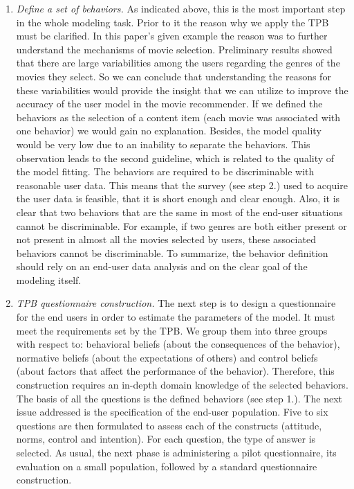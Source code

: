 \documentclass{llncs}
\begin{document}
\begin{enumerate}
 \item {\it Define a set of behaviors.} As indicated above, this is the most important step in the whole modeling task. Prior to it the reason why we apply the TPB must be clarified. In this paper’s given example the reason was to further understand the mechanisms of movie selection. Preliminary results showed that there are large variabilities among the users regarding the genres of the movies they select. So we can conclude that understanding the reasons for these variabilities would provide the insight that we can utilize to improve the accuracy of the user model in the movie recommender. If we defined the behaviors as the selection of a content item (each movie was associated with one behavior) we would gain no explanation. Besides, the model quality would be very low due to an inability to separate the behaviors. This observation leads to the second guideline, which is related to the quality of the model fitting. The behaviors are required to be discriminable with reasonable user data. This means that the survey (see step 2.) used to acquire the user data is feasible, that it is short enough and clear enough. Also, it is clear that two behaviors that are the same in most of the end-user situations cannot be discriminable. For example, if two genres are both either present or not present in almost all the movies selected by users, these associated behaviors cannot be discriminable. To summarize, the behavior definition should rely on an end-user data analysis and on the clear goal of the modeling itself.   
 \item {\it TPB questionnaire construction.} The next step is to design a questionnaire for the end users in order to estimate the parameters of the model. It must meet the requirements set by the TPB. We group them into three groups with respect to: behavioral beliefs (about the consequences of the behavior), normative beliefs (about the expectations of others) and control beliefs (about factors that affect the performance of the behavior). Therefore, this construction requires an in-depth domain knowledge of the selected behaviors. The basis of all the questions is the defined behaviors (see step 1.). The next issue addressed is the specification of the end-user population. Five to six questions are then formulated to assess each of the constructs (attitude, norms, control and intention). For each question, the type of answer is selected. As usual, the next phase is administering a pilot questionnaire, its evaluation on a small population, followed by a standard questionnaire construction. 

\end{enumerate}
\end{document}
